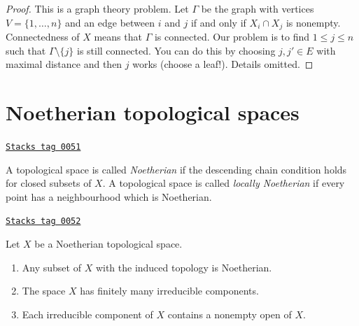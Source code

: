 \begin{proof}
This is a graph theory problem. Let $\Gamma$ be the graph with vertices
$V = \{1, \ldots, n\}$ and an edge between $i$ and $j$ if and only if
$X_i \cap X_j$ is nonempty. Connectedness of $X$ means that $\Gamma$
is connected. Our problem is to find $1 \leq j \leq n$ such that
$\Gamma \setminus \{j\}$ is still connected. You can do this by choosing
$j, j' \in E$ with maximal distance and then $j$ works (choose a leaf!).
Details omitted.
\end{proof}

\section{Noetherian topological spaces}
\label{topology-section-noetherian}
\begin{definition}[Noetherian]
\label{topology-definition-noetherian}
\href{https://stacks.math.columbia.edu/tag/0051}{\texttt{Stacks tag 0051}}

A topological space is called {\it Noetherian}
if the descending chain condition holds for
closed subsets of $X$. A topological space is called
{\it locally Noetherian} if every point has a neighbourhood
which is Noetherian.
\end{definition}

\begin{lemma}[Noetherian]
\label{topology-lemma-Noetherian}
\href{https://stacks.math.columbia.edu/tag/0052}{\texttt{Stacks tag 0052}}

Let $X$ be a Noetherian topological space.
\begin{enumerate}
\item Any subset of $X$ with the induced topology is Noetherian.
\item The space $X$ has finitely many irreducible components.
\item Each irreducible component of $X$ contains a nonempty open of $X$.
\end{enumerate}
\end{lemma}

